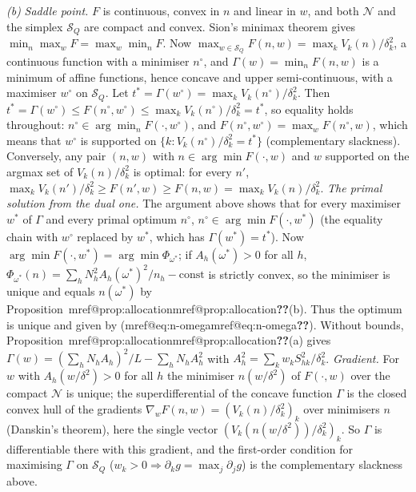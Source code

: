 \documentclass[pdflatex,sn-mathphys-num,iicol]{sn-jnl}
\makeatletter
\theoremstyle{thmstyleone}
\theoremstyle{thmstyletwo}
\theoremstyle{thmstylethree}
\newcommand{\Mref}[1]{\ifcsname mref@#1\endcsname\csname mref@#1\endcsname\else\textbf{??}\fi}
\makeatother
\begin{document}
\emph{(b)} \emph{Saddle point.} $F$ is continuous, convex in $n$ and linear in $w$, and both $\mathcal N$ and the simplex $\mathcal S_Q$ are compact and convex. Sion's minimax theorem \citep{sion1958} gives $\min_n\max_wF=\max_w\min_nF$. Now $\max_{w\in\mathcal S_Q}F(n,w)=\max_kV_k(n)/\delta_k^2$, a continuous function with a minimiser $n^\circ$, and $\Gamma(w)=\min_nF(n,w)$ is a minimum of affine functions, hence concave and upper semi-continuous, with a maximiser $w^\circ$ on $\mathcal S_Q$. Let $t^\ast=\Gamma(w^\circ)=\max_kV_k(n^\circ)/\delta_k^2$. Then $t^\ast=\Gamma(w^\circ)\le F(n^\circ,w^\circ)\le\max_kV_k(n^\circ)/\delta_k^2=t^\ast$, so equality holds throughout: $n^\circ\in\arg\min_nF(\cdot,w^\circ)$, and $F(n^\circ,w^\circ)=\max_wF(n^\circ,w)$, which means that $w^\circ$ is supported on $\{k:V_k(n^\circ)/\delta_k^2=t^\ast\}$ (complementary slackness). Conversely, any pair $(n,w)$ with $n\in\arg\min F(\cdot,w)$ and $w$ supported on the argmax set of $V_k(n)/\delta_k^2$ is optimal: for every $n'$, $\max_kV_k(n')/\delta_k^2\ge F(n',w)\ge F(n,w)=\max_kV_k(n)/\delta_k^2$.
\emph{The primal solution from the dual one.} The argument above shows that for every maximiser $w^\ast$ of $\Gamma$ and every primal optimum $n^\circ$, $n^\circ\in\arg\min F(\cdot,w^\ast)$ (the equality chain with $w^\circ$ replaced by $w^\ast$, which has $\Gamma(w^\ast)=t^\ast$). Now $\arg\min F(\cdot,w^\ast)=\arg\min\Phi_{\omega^\ast}$; if $A_h(\omega^\ast)>0$ for all $h$, $\Phi_{\omega^\ast}(n)=\sum_hN_h^2A_h(\omega^\ast)^2/n_h-\text{const}$ is strictly convex, so the minimiser is unique and equals $n(\omega^\ast)$ by Proposition~\Mref{prop:allocation}(b). Thus the optimum is unique and given by (\Mref{eq:n-omega}). Without bounds, Proposition~\Mref{prop:allocation}(a) gives $\Gamma(w)=(\sum_hN_hA_h)^2/L-\sum_hN_hA_h^2$ with $A_h^2=\sum_kw_kS^2_{hk}/\delta_k^2$.
\emph{Gradient.} For $w$ with $A_h(w/\delta^2)>0$ for all $h$ the minimiser $n(w/\delta^2)$ of $F(\cdot,w)$ over the compact $\mathcal N$ is unique; the superdifferential of the concave function $\Gamma$ is the closed convex hull of the gradients $\nabla_wF(n,w)=(V_k(n)/\delta_k^2)_k$ over minimisers $n$ (Danskin's theorem), here the single vector $(V_k(n(w/\delta^2))/\delta_k^2)_k$. So $\Gamma$ is differentiable there with this gradient, and the first-order condition for maximising $\Gamma$ on $\mathcal S_Q$ ($w_k>0\Rightarrow\partial_kg=\max_j\partial_jg$) is the complementary slackness above.
\end{document}
